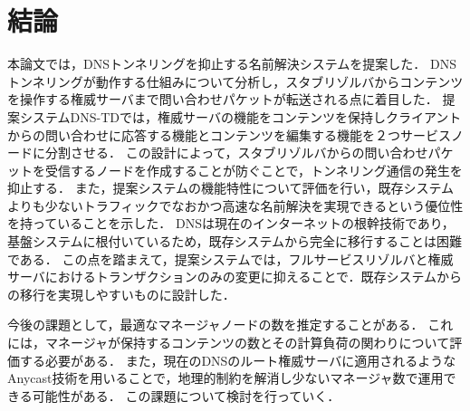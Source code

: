 \section{結論}
本論文では，DNSトンネリングを抑止する名前解決システムを提案した．
DNSトンネリングが動作する仕組みについて分析し，スタブリゾルバからコンテンツを操作する権威サーバまで問い合わせパケットが転送される点に着目した．
提案システムDNS-TDでは，権威サーバの機能をコンテンツを保持しクライアントからの問い合わせに応答する機能とコンテンツを編集する機能を２つサービスノードに分割させる．
この設計によって，スタブリゾルバからの問い合わせパケットを受信するノードを作成することが防ぐことで，トンネリング通信の発生を抑止する．
また，提案システムの機能特性について評価を行い，既存システムよりも少ないトラフィックでなおかつ高速な名前解決を実現できるという優位性を持っていることを示した．
DNSは現在のインターネットの根幹技術であり，基盤システムに根付いているため，既存システムから完全に移行することは困難である．
この点を踏まえて，提案システムでは，フルサービスリゾルバと権威サーバにおけるトランザクションのみの変更に抑えることで．既存システムからの移行を実現しやすいものに設計した．

今後の課題として，最適なマネージャノードの数を推定することがある．
これには，マネージャが保持するコンテンツの数とその計算負荷の関わりについて評価する必要がある．
また，現在のDNSのルート権威サーバに適用されるようなAnycast技術を用いることで，地理的制約を解消し少ないマネージャ数で運用できる可能性がある．
この課題について検討を行っていく．
